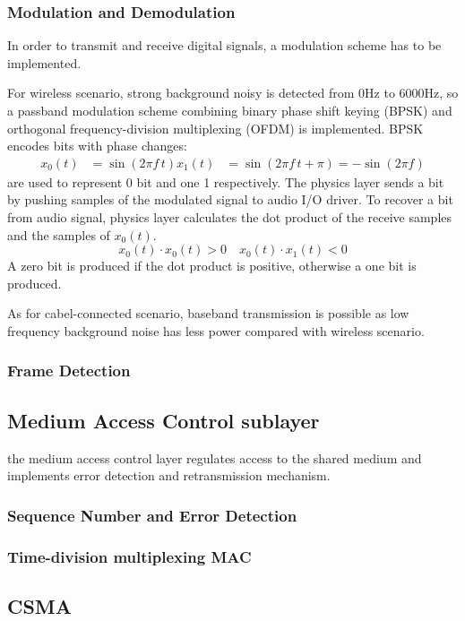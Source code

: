 \subsubsection{Modulation and Demodulation}
In order to transmit and receive digital signals, a modulation scheme has to be implemented.
\par
For wireless scenario, strong background noisy is detected from 0Hz to 6000Hz,
so a passband modulation scheme
combining binary phase shift keying (BPSK) and orthogonal frequency-division multiplexing (OFDM)
is implemented.
BPSK encodes bits with phase changes:
\begin{align*}
	x_0(t) & =\sin(2\pi f\, t)
	x_1(t) & =\sin(2\pi f\, t + \pi) = -\sin(2\pi f)
\end{align*}
are used to represent 0 bit and one 1 respectively.
The physics layer sends a bit by pushing samples of the modulated signal to audio I/O driver.
To recover a bit from audio signal, physics layer calculates the dot product of the receive samples and the samples of $x_0(t)$.
\[
	x_0(t)\cdot x_0(t) > 0
	\quad
	x_0(t)\cdot x_1(t) < 0
\]
A zero bit is produced if the dot product is positive, otherwise a one bit is produced.

As for cabel-connected scenario, baseband transmission is possible as low frequency background noise has less power compared with wireless scenario.



\subsubsection{Frame Detection}

\subsection{Medium Access Control sublayer}
the medium access control layer regulates access to the shared medium and implements error detection and retransmission mechanism.

\subsubsection{Sequence Number and Error Detection}

\subsubsection{Time-division multiplexing MAC}

\subsection{CSMA}
